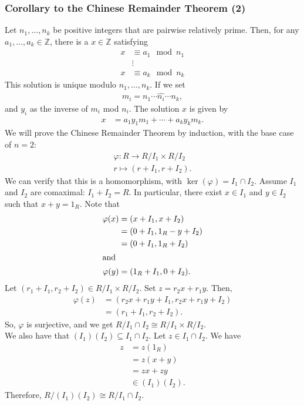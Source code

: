 \documentclass[8pt]{extarticle}
\newcommand{\Z}{\mathbb{Z}}
\begin{document}
  \subsubsection{Corollary to the Chinese Remainder Theorem (2)}%
  Let $n_1,\dots,n_k$ be positive integers that are pairwise relatively prime. Then, for any $a_1,\dots,a_k\in\Z$, there is a $x\in\Z$ satisfying
  \begin{align*}
   x &\equiv a_1\mod n_1\\
     &\vdots\\
   x &\equiv a_k\mod n_k
  \end{align*}
  This solution is unique modulo $n_1,\dots,n_k$. If we set
  \begin{align*}
   m_i = n_1\cdots \hat{n_i}\cdots n_k,
  \end{align*}
  and $y_i$ as the inverse of $m_i$ mod $n_i$. The solution $x$ is given by
  \begin{align*}
   x &= a_1y_1m_1 + \cdots + a_ky_km_k.
  \end{align*}
  We will prove the Chinese Remainder Theorem by induction, with the base case of $n=2$:
  \begin{align*}
   \varphi: R\rightarrow R/I_1 \times R/I_2\\
   r \mapsto (r+I_1,r+I_2).
  \end{align*}
  We can verify that this is a homomorphism, with $\ker(\varphi) = I_1\cap I_2$. Assume $I_1$ and $I_2$ are comaximal: $I_1 + I_2 = R$. In particular, there exist $x\in I_1$ and $y\in I_2$ such that $x + y = 1_R$. Note that
  \begin{align*}
   \varphi(x) &= (x+I_1,x+I_2) \\
              &= (0+I_1,1_R - y + I_2)\\
              &= (0+I_1,1_R + I_2)\\
              \intertext{and}
   \varphi(y) &= (1_R + I_1,0+I_2).
  \end{align*}
  Let $(r_1 + I_1,r_2 + I_2)\in R/I_1 \times R/I_2$. Set $z = r_2x + r_1y$. Then,
  \begin{align*}
   \varphi(z) &= (r_2x + r_1y + I_1,r_2x + r_1y + I_2)\\
              &= (r_1 + I_1,r_2 + I_2).
  \end{align*}
  So, $\varphi$ is surjective, and we get $R/I_1\cap I_2 \cong R/I_1\times R/I_2$.\\

  We also have that $(I_1)(I_2)\subseteq I_1\cap I_2$. Let $z\in I_1\cap I_2$. We have
  \begin{align*}
   z &= z(1_R)\\
   &= z(x+y)\\
   &= zx + zy\\
   &\in (I_1)(I_2).
  \end{align*}
  Therefore, $R/(I_1)(I_2)\cong R/I_1\cap I_2$.\\
\end{document}
